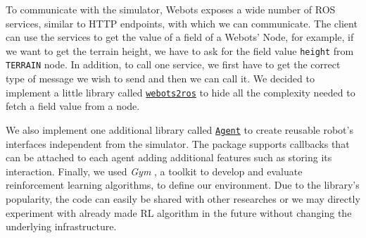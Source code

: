 \documentclass[../document.tex]{subfiles}
\begin{document}
To communicate with the simulator, Webots exposes a wide number of ROS services, similar to HTTP endpoints, with which we can communicate. The client can use the services to get the value of a field of a Webots' Node, for example, if we want to get the terrain height, we have to ask for the field value \texttt{height} from \texttt{TERRAIN} node. In addition, to call one service, we first have to get the correct type of message we wish to send and then we can call it. We decided to implement a little library called \href{https://github.com/FrancescoSaverioZuppichini/Master-Thesis/tree/master/core/utilities/webots2ros}{\texttt{webots2ros}} to hide all the complexity needed to fetch a field value from a node.

We also implement one additional library called \href{https://github.com/FrancescoSaverioZuppichini/Master-Thesis/tree/master/core/simulation/agent}{\texttt{Agent}} to create reusable robot's interfaces independent from the simulator. The package supports callbacks that can be attached to each agent adding additional features such as storing its interaction. Finally, we used \emph{Gym} \cite{gym}, a toolkit to develop and evaluate reinforcement learning algorithms, to define our environment. Due to the library's popularity, the code can easily be shared with other researches or we may directly experiment with already made RL algorithm in the future without changing the underlying infrastructure.
\end{document}
